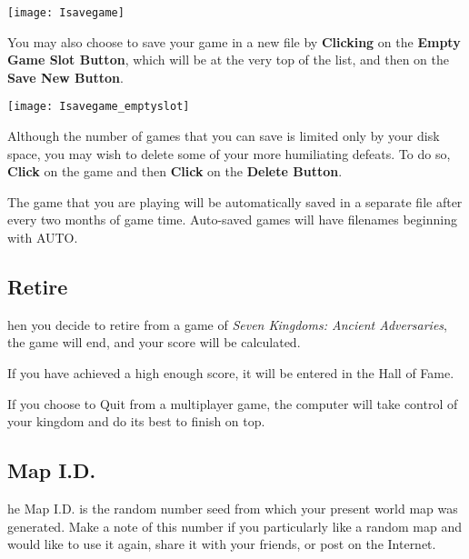 \begin{center}
	\texttt{[image: Isavegame]} %
\end{center}

You may also choose to save your game in a new file by \textbf{Clicking} on the \textbf{Empty Game Slot Button}, which will be at the very top of the list, and then on the \textbf{Save New Button}.

\begin{center}
	\texttt{[image: Isavegame\_emptyslot]} %
\end{center}

Although the number of games that you can save is limited only by your disk space, you may wish to delete some of your more humiliating defeats. To do so, \textbf{Click} on the game and then \textbf{Click} on the \textbf{Delete Button}.


The game that you are playing will be automatically saved in a separate file after every two months of game time. Auto-saved games will have filenames beginning with AUTO.

\subsection{Retire}


hen you decide to retire from a game of \textit{Seven Kingdoms: Ancient Adversaries}, the game will end, and your score will be calculated.

If you have achieved a high enough score, it will be entered in the Hall of Fame.

If you choose to Quit from a multiplayer game, the computer will take control of your kingdom and do its best to finish on top.

\subsection{Map I.D.}



he Map I.D. is the random number seed from which your present world map was generated. Make a note of this number if you particularly like a random map and would like to use it again, share it with your friends, or post on the Internet.

